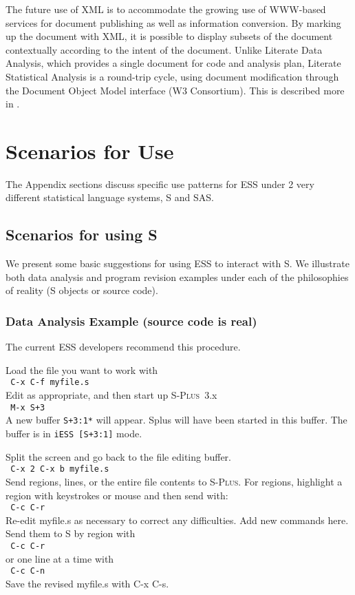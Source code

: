 \documentclass{article}
\newcommand*{\Splus}{\textsc{S-Plus}}
\newcommand{\elcode}[1]{\\{\tt\hspace*{2em} #1}\\}
\begin{document}
The future use of XML is to accommodate the growing use of WWW-based
services for document publishing as well as information conversion.
By marking up the document with XML, it is possible to display subsets
of the document contextually according to the intent of the document.
Unlike Literate Data Analysis, which provides a single document for
code and analysis plan, Literate Statistical Analysis is a round-trip
cycle, using document modification through the Document Object Model
interface (W3 Consortium).  This is described more in
\citep{ross:lunt:2001}. 



\appendix


\section{Scenarios for Use}
\label{app:scenarios}

The Appendix sections discuss specific use patterns for ESS under 2 very
different statistical language systems, S and SAS.

\subsection{Scenarios for using S}
\label{sec:S:scenarios}

We present some basic suggestions for using ESS to interact with S.
We illustrate both data analysis and program revision examples under each of
the philosophies of reality (S objects or source code).

\subsubsection{Data Analysis Example (source code is real)}
The current ESS developers recommend this procedure.

\noindent
Load the file you want to work with
  \elcode{C-x C-f myfile.s}
Edit as appropriate, and then start up \Splus~3.x
  \elcode{M-x S+3}
A new buffer {\tt *S+3:1*} will appear.  Splus will have been started
in this buffer.  The buffer is in {\tt iESS [S+3:1]} mode.

Split the screen and go back to the file editing buffer.
  \elcode{C-x 2 C-x b myfile.s}
Send regions, lines, or the entire file contents to \Splus.
For regions, highlight a region with keystrokes or mouse
and then send with:
  \elcode{C-c C-r}
Re-edit myfile.s as necessary to correct any difficulties.  Add
new commands here.  Send them to S by region with
  \elcode{C-c C-r}
or one line at a time with
  \elcode{C-c C-n}
Save the revised myfile.s with C-x C-s.
\end{document}
